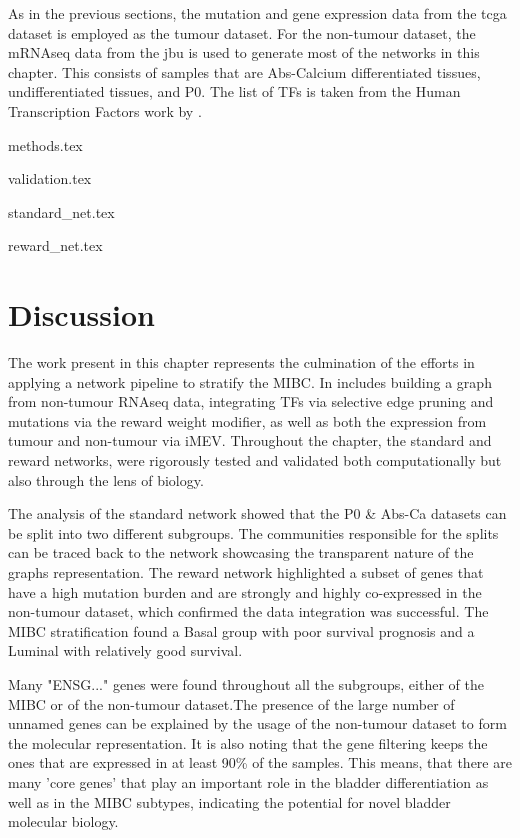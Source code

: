 As in the previous sections, the mutation and gene expression data from the \acrshort{tcga} dataset is employed as the tumour dataset. For the non-tumour dataset, the mRNAseq data from the \acrfull{jbu} is used to generate most of the networks in this chapter. This consists of samples that are Abs-Calcium differentiated tissues, undifferentiated tissues, and P0. The list of TFs is taken from the Human Transcription Factors work by \citet{Lambert2018-el}.



{methods.tex}

{validation.tex}

{standard_net.tex}

{reward_net.tex}

\section{Discussion}

The work present in this chapter represents the culmination of the efforts in applying a network pipeline to stratify the MIBC. In includes building a graph from non-tumour RNAseq data, integrating TFs via selective edge pruning and mutations via the reward weight modifier, as well as both the expression from tumour and non-tumour via iMEV. Throughout the chapter, the standard and reward networks, were rigorously tested and validated both computationally but also through the lens of biology. 

The analysis of the standard network showed that the P0 \& Abs-Ca datasets can be split into two different subgroups. The communities responsible for the splits can be traced back to the network showcasing the transparent nature of the graphs representation. The reward network highlighted a subset of genes that have a high mutation burden and are strongly and highly co-expressed in the non-tumour dataset, which confirmed the data integration was successful. The MIBC stratification found a Basal group with poor survival prognosis and a Luminal with relatively good survival.

Many "ENSG..." genes were found throughout all the subgroups, either of the MIBC or of the non-tumour dataset.The presence of the large number of unnamed genes can be explained by the usage of the non-tumour dataset to form the molecular representation. It is also noting that the gene filtering keeps the ones that are expressed in at least 90\% of the samples. This means, that there are many 'core genes' that play an important role in the bladder differentiation as well as in the MIBC subtypes, indicating the potential for novel bladder molecular biology. 

